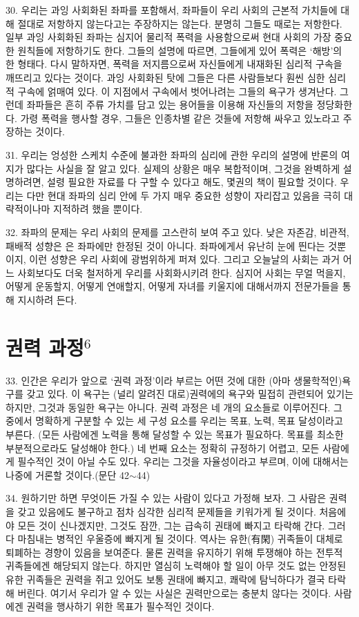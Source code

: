 \documentclass[11pt,a4paper]{article}
\begin{document}
\begin{multicols}{2}
30. 우리는 과잉 사회화된 좌파를 포함해서, 좌파들이 우리 사회의 근본적 가치들에 대해 절대로  저항하지 않는다고는 주장하지는 않는다. 분명히 그들도 때로는 저항한다. 일부 과잉 사회화된 좌파는  심지어 물리적 폭력을 사용함으로써 현대 사회의 가장 중요한 원칙들에 저항하기도 한다. 그들의 설명에  따르면, 그들에게 있어 폭력은 `해방'의 한 형태다. 다시 말하자면, 폭력을 저지름으로써 자신들에게  내재화된 심리적 구속을 깨뜨리고 있다는 것이다. 과잉 사회화된 탓에 그들은 다른 사람들보다 훤씬 심한  심리적 구속에 얽매여 있다. 이 지점에서 구속에서 벗어나려는 그들의 욕구가 생겨난다. 그런데 좌파들은  흔히 주류 가치를 담고 있는 용어들을 이용해 자신들의 저항을 정당화한다. 가령 폭력을 행사할 경우,  그들은 인종차별 같은 것들에 저항해 싸우고 있노라고 주장하는 것이다.


31. 우리는 엉성한 스케치 수준에 불과한 좌파의 심리에 관한 우리의 설명에 반론의 여지가 많다는  사실을 잘 알고 있다. 실제의 상황은 매우 복합적이며, 그것을 완벽하게 설명하려면, 설령 필요한 자료를  다 구할 수 있다고 해도, 몇권의 책이 필요할 것이다. 우리는 다만 현대 좌파의 심리 안에 두 가지 매우  중요한 성향이 자리잡고 있음을 극히 대략적이나마 지적하려 했을 뿐이다. 


32. 좌파의 문제는 우리 사회의 문제를 고스란히 보여 주고 있다. 낮은 자존감, 비관적, 패배적 성향은 은  좌파에만 한정된 것이 아니다. 좌파에게서 유난히 눈에 띈다는 것뿐이지, 이런 성향은 우리 사회에  광범위하게 퍼져 있다. 그리고 오늘날의 사회는 과거 어느 사회보다도 더욱 철저하게 우리를  사회화시키려 한다. 심지어 사회는 무얼 먹을지, 어떻게 운동할지, 어떻게 연애할지, 어떻게 자녀를  키울지에 대해서까지 전문가들을 통해 지시하려 든다. 


\section*{권력 과정\hyperlink{6}{$^{6}$}} 
33. 인간은 우리가 앞으로 `권력 과정'이라 부르는 어떤 것에 대한 (아마 생물학적인)욕구를 갖고 있다. 이 욕구는 (널리 알려진 대로)권력에의 욕구와 밀접히 관련되어 있기는 하지만, 그것과 동일한 욕구는  아니다. 권력 과정은 네 개의 요소들로 이루어진다. 그 중에서 명확하게 구분할 수 있는 세 구성 요소를  우리는 목표, 노력, 목표 달성이라고 부른다. (모든 사람에겐 노력을 통해 달성할 수 있는 목표가  필요하다. 목표를 최소한 부분적으로라도 달성해야 한다.) 네 번째 요소는 정확히 규정하기 어렵고, 모든 사람에게 필수적인 것이 아닐 수도 있다. 우리는 그것을 자율성이라고 부르며, 이에 대해서는 나중에  거론할 것이다.(문단 42${\sim}$44) 


34. 원하기만 하면 무엇이든 가질 수 있는 사람이 있다고 가정해 보자. 그 사람은 권력을 갖고 있음에도  불구하고 점차 심각한 심리적 문제들을 키워가게 될 것이다. 처음에야 모든 것이 신나겠지만, 그것도  잠깐, 그는 급속히 권태에 빠지고 타락해 간다. 그러다 마침내는 병적인 우울증에 빠지게 될 것이다.  역사는 유한(有閑) 귀족들이 대체로 퇴폐하는 경향이 있음을 보여준다. 물론 권력을 유지하기 위해  투쟁해야 하는 전투적 귀족들에겐 해당되지 않는다. 하지만 열심히 노력해야 할 일이 아무 것도 없는  안정된 유한 귀족들은 권력을 쥐고 있어도 보통 권태에 빠지고, 쾌락에 탐닉하다가 결국 타락해 버린다.  여기서 우리가 알 수 있는 사실은 권력만으로는 충분치 않다는 것이다. 사람에겐 권력을 행사하기 위한  목표가 필수적인 것이다. 



\end{multicols}
\end{document}
